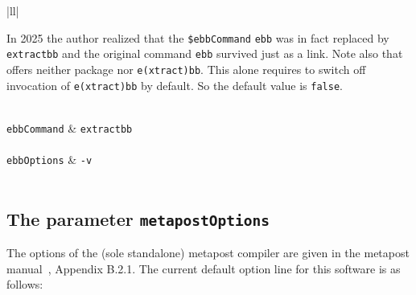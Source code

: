\begin{longtable}{|ll|}
{\begin{minipage}{0.95\linewidth}
   In 2025 the author realized that the \texttt{\$ebbCommand} \texttt{ebb} 
   was in fact replaced by \texttt{extractbb} 
   and the original command \texttt{ebb} survived just as a link.
   Note also that \miktex{} offers neither package  
   nor \texttt{e(xtract)bb}.  %
   This alone requires to switch off invocation of \texttt{e(xtract)bb} by default.  %
   So the default value is \texttt{false}. 
  \end{minipage}
} \\
\texttt{ebbCommand} & \texttt{extractbb} \\
 \\
\texttt{ebbOptions} & \texttt{-v} \\
 \\
\end{longtable}

\subsection{The parameter \texttt{metapostOptions}}%
\label{subsec:metapostOptions}

The options of the (sole standalone) metapost compiler 
are given in the metapost manual~\cite{MPost24}, Appendix B.2.1. 
The current default option line for this software is as follows: 
%
\begin{center}
  {\scriptsize\texttt{\metapostOptions}}
\end{center}

